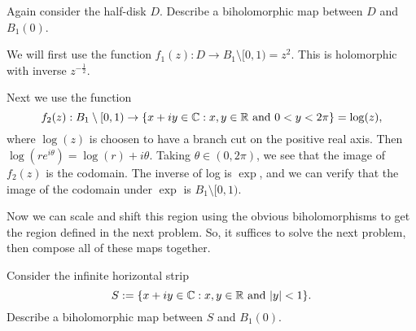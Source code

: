 \documentclass{homework}
\begin{document}
                                                                                            \begin{problem}
                                                                                              Again consider the half-disk $D$. Describe a biholomorphic map between $D$ and $B_1(0)$.
                                                                                              \end{problem}
                                                                                              \begin{solution}

                                                                                              We will first use the function $f_1(z): D \to B_1\setminus [0, 1) = z^2.$  This is holomorphic with inverse $z^{-\frac{1}{2}}$.

                                                                                              Next we use the function 
                                                                                              \[
                                                                                              f_2(z): B_1\setminus [0, 1) \to \{ x + iy \in \mathbb{C} : x, y \in \mathbb{R} \mbox{ and } 0 < y < 2\pi \} = \log(z),
                                                                                              \]
                                                                                              where $\log(z)$ is choosen to have a branch cut on the positive real axis. Then $\log(re^{i\theta}) = \log(r)  + i\theta$. Taking $\theta \in (0, 2\pi)$, we see that the image of $f_2(z)$ is the codomain. The inverse of log is $\exp$, and we can verify that the image of the codomain under $\exp$ is $B_1\setminus [0, 1)$.

                                                                                              Now we can scale and shift this region using the obvious biholomorphisms to get the region defined in the next problem. So, it suffices to solve the next problem, then compose all of these maps together.
                                                                                              \end{solution}
                                                                                              \begin{problem}
                                                                                                Consider the infinite horizontal strip
                                                                                                  \[
                                                                                                      S := \{ x + iy \in \mathbb{C} : x, y \in \mathbb{R} \mbox{ and } |y| < 1 \}.
                                                                                                        \]
                                                                                                          Describe a biholomorphic map between $S$ and $B_1(0)$.  
                                                                                                          \end{problem}
\end{document}

